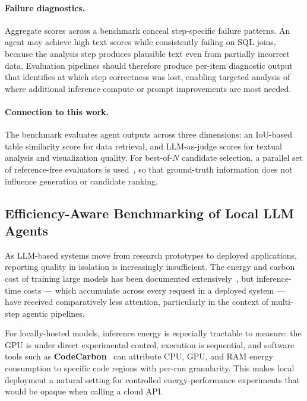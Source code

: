 \paragraph{Failure diagnostics.}
Aggregate scores across a benchmark conceal step-specific failure patterns.
An agent may achieve high text scores while consistently failing on SQL joins,
because the analysis step produces plausible text even from partially incorrect
data.
Evaluation pipelines should therefore produce per-item diagnostic output that
identifies at which step correctness was lost, enabling targeted analysis of
where additional inference compute or prompt improvements are most needed.

\paragraph{Connection to this work.}
The benchmark evaluates agent outputs across three dimensions: an IoU-based
table similarity score for data retrieval, and LLM-as-judge scores for textual
analysis and visualization quality.
For best-of-$N$ candidate selection, a parallel set of reference-free
evaluators is used~\cite{wang2023selfconsistency}, so that ground-truth
information does not influence generation or candidate ranking.

\subsection{Efficiency-Aware Benchmarking of Local LLM Agents}\label{sec:benchmarking}

As LLM-based systems move from research prototypes to deployed applications,
reporting quality in isolation is increasingly insufficient.
The energy and carbon cost of training large models has been documented
extensively~\cite{strubell2019energy, schwartz2020greenai}, but inference-time
costs --- which accumulate across every request in a deployed system --- have
received comparatively less attention, particularly in the context of multi-step
agentic pipelines.

For locally-hosted models, inference energy is especially tractable to measure:
the GPU is under direct experimental control, execution is sequential, and
software tools such as \textbf{CodeCarbon}~\cite{lottick2019codecarbon} can attribute
CPU, GPU, and RAM energy consumption to specific code regions with per-run
granularity.
This makes local deployment a natural setting for controlled energy-performance
experiments that would be opaque when calling a cloud API.

